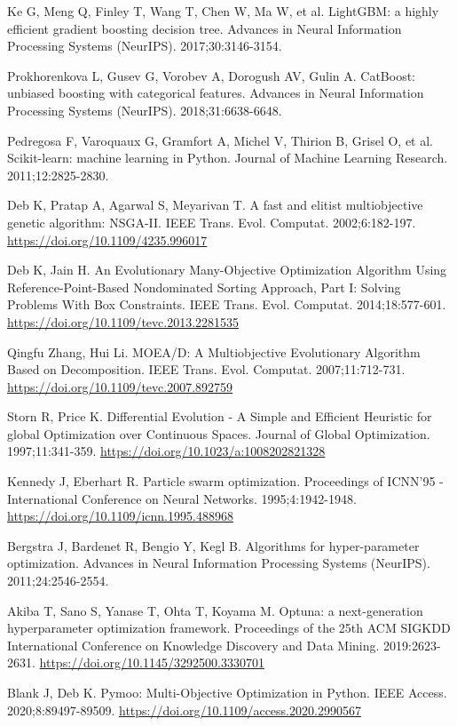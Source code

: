 Ke G, Meng Q, Finley T, Wang T, Chen W, Ma W, et al. LightGBM: a highly efficient gradient boosting decision tree. Advances in Neural Information Processing Systems (NeurIPS). 2017;30:3146-3154.

Prokhorenkova L, Gusev G, Vorobev A, Dorogush AV, Gulin A. CatBoost: unbiased boosting with categorical features. Advances in Neural Information Processing Systems (NeurIPS). 2018;31:6638-6648.

Pedregosa F, Varoquaux G, Gramfort A, Michel V, Thirion B, Grisel O, et al. Scikit-learn: machine learning in Python. Journal of Machine Learning Research. 2011;12:2825-2830.

Deb K, Pratap A, Agarwal S, Meyarivan T. A fast and elitist multiobjective genetic algorithm: NSGA-II. IEEE Trans. Evol. Computat. 2002;6:182-197.
\href{https://doi.org/10.1109/4235.996017}{https://doi.org/10.1109/4235.996017}

Deb K, Jain H. An Evolutionary Many-Objective Optimization Algorithm Using Reference-Point-Based Nondominated Sorting Approach, Part I: Solving Problems With Box Constraints. IEEE Trans. Evol. Computat. 2014;18:577-601.
\href{https://doi.org/10.1109/tevc.2013.2281535}{https://doi.org/10.1109/tevc.2013.2281535}

Qingfu Zhang, Hui Li. MOEA/D: A Multiobjective Evolutionary Algorithm Based on Decomposition. IEEE Trans. Evol. Computat. 2007;11:712-731.
\href{https://doi.org/10.1109/tevc.2007.892759}{https://doi.org/10.1109/tevc.2007.892759}

Storn R, Price K. Differential Evolution - A Simple and Efficient Heuristic for global Optimization over Continuous Spaces. Journal of Global Optimization. 1997;11:341-359.
\href{https://doi.org/10.1023/a:1008202821328}{https://doi.org/10.1023/a:1008202821328}

Kennedy J, Eberhart R. Particle swarm optimization. Proceedings of ICNN'95 - International Conference on Neural Networks. 1995;4:1942-1948.
\href{https://doi.org/10.1109/icnn.1995.488968}{https://doi.org/10.1109/icnn.1995.488968}

Bergstra J, Bardenet R, Bengio Y, Kegl B. Algorithms for hyper-parameter optimization. Advances in Neural Information Processing Systems (NeurIPS). 2011;24:2546-2554.

Akiba T, Sano S, Yanase T, Ohta T, Koyama M. Optuna: a next-generation hyperparameter optimization framework. Proceedings of the 25th ACM SIGKDD International Conference on Knowledge Discovery and Data Mining. 2019:2623-2631.
\href{https://doi.org/10.1145/3292500.3330701}{https://doi.org/10.1145/3292500.3330701}

Blank J, Deb K. Pymoo: Multi-Objective Optimization in Python. IEEE Access. 2020;8:89497-89509.
\href{https://doi.org/10.1109/access.2020.2990567}{https://doi.org/10.1109/access.2020.2990567}
